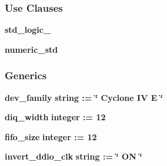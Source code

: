 \subsubsection*{Use Clauses}
 \begin{DoxyCompactItemize}
\item 
{\bf std\+\_\+logic\+\_}   
\item 
{\bf numeric\+\_\+std}   
\end{DoxyCompactItemize}
\subsubsection*{Generics}
 \begin{DoxyCompactItemize}
\item 
{\bf dev\+\_\+family} {\bfseries {\bfseries \textcolor{comment}{string}\textcolor{vhdlchar}{ }\textcolor{vhdlchar}{ }\textcolor{vhdlchar}{\+:}\textcolor{vhdlchar}{=}\textcolor{vhdlchar}{ }\textcolor{vhdlchar}{ }\textcolor{vhdlchar}{ }\textcolor{vhdlchar}{ }\textcolor{keyword}{\char`\"{} Cyclone I\+V E \char`\"{}}\textcolor{vhdlchar}{ }}}
\item 
{\bf diq\+\_\+width} {\bfseries {\bfseries \textcolor{comment}{integer}\textcolor{vhdlchar}{ }\textcolor{vhdlchar}{ }\textcolor{vhdlchar}{\+:}\textcolor{vhdlchar}{=}\textcolor{vhdlchar}{ }\textcolor{vhdlchar}{ } \textcolor{vhdldigit}{12} \textcolor{vhdlchar}{ }}}
\item 
{\bf fifo\+\_\+size} {\bfseries {\bfseries \textcolor{comment}{integer}\textcolor{vhdlchar}{ }\textcolor{vhdlchar}{ }\textcolor{vhdlchar}{\+:}\textcolor{vhdlchar}{=}\textcolor{vhdlchar}{ }\textcolor{vhdlchar}{ } \textcolor{vhdldigit}{12} \textcolor{vhdlchar}{ }}}
\item 
{\bf invert\+\_\+ddio\+\_\+clk} {\bfseries {\bfseries \textcolor{comment}{string}\textcolor{vhdlchar}{ }\textcolor{vhdlchar}{ }\textcolor{vhdlchar}{\+:}\textcolor{vhdlchar}{=}\textcolor{vhdlchar}{ }\textcolor{vhdlchar}{ }\textcolor{vhdlchar}{ }\textcolor{vhdlchar}{ }\textcolor{keyword}{\char`\"{} O\+N \char`\"{}}\textcolor{vhdlchar}{ }}}
\end{DoxyCompactItemize}
